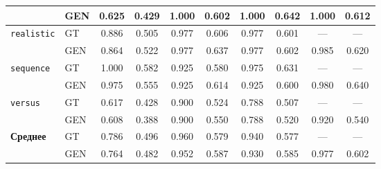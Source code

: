 \begin{table}[H]
\begin{tabular}{l|l|cc|cc|cc|cc}
                                            & GEN                              & 0.625                             & 0.429                              & 1.000                               & 0.602                              & 1.000       & 0.642       & 1.000       & 0.612       \\
        \hline
        \multirow{2}{*}{\texttt{realistic}}
                                            & GT                               & 0.886                             & 0.505                              & 0.977                               & 0.606                              & 0.977       & 0.601       & ---         & ---         \\
                                            & GEN                              & 0.864                             & 0.522                              & 0.977                               & 0.637                              & 0.977       & 0.602       & 0.985       & 0.620       \\
        \hline
        \multirow{2}{*}{\texttt{sequence}}
                                            & GT                               & 1.000                             & 0.582                              & 0.925                               & 0.580                              & 0.975       & 0.631       & ---         & ---         \\
                                            & GEN                              & 0.975                             & 0.555                              & 0.925                               & 0.614                              & 0.925       & 0.600       & 0.980       & 0.640       \\
        \hline
        \multirow{2}{*}{\texttt{versus}}
                                            & GT                               & 0.617                             & 0.428                              & 0.900                               & 0.524                              & 0.788       & 0.507       & ---         & ---         \\
                                            & GEN                              & 0.608                             & 0.388                              & 0.900                               & 0.550                              & 0.788       & 0.520       & 0.920       & 0.540       \\
        \hline
        \hline
        \multirow{2}{*}{\textbf{Среднее}}
                                            & GT                               & 0.786                             & 0.496                              & 0.960                               & 0.579                              & 0.940       & 0.577       & ---         & ---         \\
                                            & GEN                              & 0.764                             & 0.482                              & 0.952                               & 0.587                              & 0.930       & 0.585       & 0.977       & 0.602       \\
        \hline
    \end{tabular}
\end{table}


